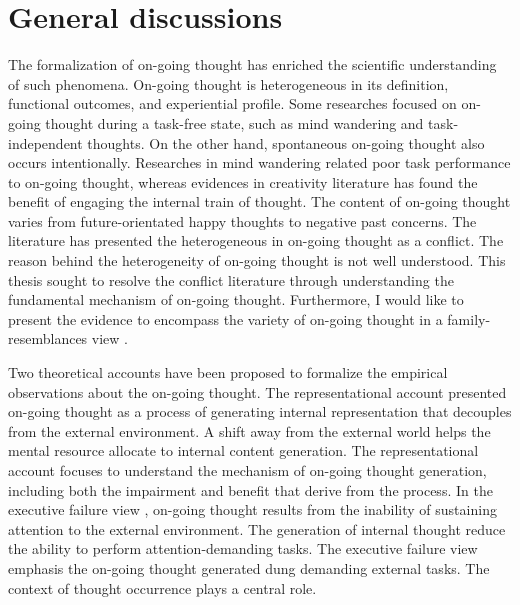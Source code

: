 \chapter{General discussions}
\label{ch:discussion}

The formalization of on-going thought \cite{SmallwoodSchooler2006} has enriched the scientific understanding of such phenomena. On-going thought is heterogeneous in its definition, functional outcomes, and experiential profile. Some researches focused on on-going thought during a task-free state, such as mind wandering and task-independent thoughts. On the other hand, spontaneous on-going thought also occurs intentionally. Researches in mind wandering related poor task performance to on-going thought, whereas evidences in creativity literature has found the benefit of engaging the internal train of thought. The content of on-going thought varies from future-orientated happy thoughts to negative past concerns. The literature has presented the heterogeneous in on-going thought as a conflict. The reason behind the heterogeneity of on-going thought is not well understood. This thesis sought to resolve the conflict literature through understanding the fundamental mechanism of on-going thought. Furthermore, I would like to present the evidence to encompass the variety of on-going thought in a family-resemblances view \cite{Seli2018}. 

Two theoretical accounts have been proposed to formalize the empirical observations about the on-going thought. The representational account \cite{Smallwood2016} presented on-going thought as a process of generating internal representation that decouples from the external environment. A shift away from the external world helps the mental resource allocate to internal content generation. The representational account focuses to understand the mechanism of on-going thought generation, including both the impairment and benefit that derive from the process. In the executive failure view \cite{McVayJOEP2009}, on-going thought results from the inability of sustaining attention to the external environment. The generation of internal thought reduce the ability to perform attention-demanding tasks. The executive failure view emphasis the on-going thought generated dung demanding external tasks. The context of thought occurrence plays a central role.

